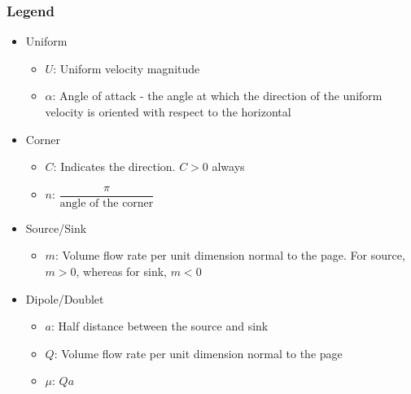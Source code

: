 \documentclass[11pt, letterpaper, notitlepage]{article}
\begin{document}
\begin{landscape}
\subsubsection{Legend}
\begin{itemize}
  \item Uniform
  \begin{itemize}
    \item $U$: Uniform velocity magnitude
    \item $\alpha$: Angle of attack - the angle at which the direction of the uniform velocity is oriented with respect to the horizontal
  \end{itemize}
  \item Corner
  \begin{itemize}
    \item $C$: Indicates the direction. $C > 0$ always
    \item $n$: $\dfrac{\pi}{\text{angle of the corner}}$
  \end{itemize} 
  \item Source/Sink
  \begin{itemize}
    \item $m$: Volume flow rate per unit dimension normal to the page. For source, $m > 0$, whereas for sink, $m < 0$
  \end{itemize}
  \item Dipole/Doublet
  \begin{itemize}
    \item $a$: Half distance between the source and sink
    \item $Q$: Volume flow rate per unit dimension normal to the page
    \item $\mu$: $Q a$
  \end{itemize}        
\end{itemize}

\end{landscape}
\end{document}
